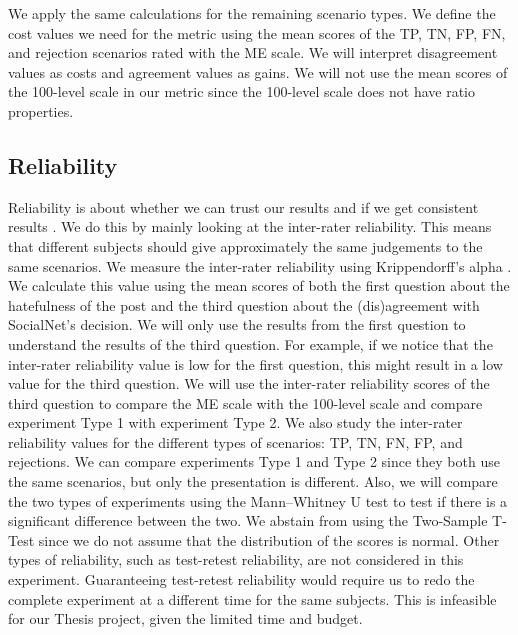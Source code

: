 \documentclass[a4paper]{article}
\begin{document}
We apply the same calculations for the remaining scenario types. We define the cost values we need for the metric using the mean scores of the TP, TN, FP, FN, and rejection scenarios rated with the ME scale. We will interpret disagreement values as costs and agreement values as gains. We will not use the mean scores of the 100-level scale in our metric since the 100-level scale does not have ratio properties.

\subsection{Reliability}
Reliability is about whether we can trust our results and if we get consistent results \cite{fitzner2007reliability}. We do this by mainly looking at the inter-rater reliability. This means that different subjects should give approximately the same judgements to the same scenarios. We measure the inter-rater reliability using Krippendorff's alpha \cite{maddalena2017crowdsourcing, krippendorff2004reliability}. We calculate this value using the mean scores of both the first question about the hatefulness of the post and the third question about the (dis)agreement with SocialNet’s decision. We will only use the results from the first question to understand the results of the third question. For example, if we notice that the inter-rater reliability value is low for the first question, this might result in a low value for the third question. We will use the inter-rater reliability scores of the third question to compare the ME scale with the 100-level scale and compare experiment Type 1 with experiment Type 2. We also study the inter-rater reliability values for the different types of scenarios: TP, TN, FN, FP, and rejections. We can compare experiments Type 1 and Type 2 since they both use the same scenarios, but only the presentation is different. Also, we will compare the two types of experiments using the Mann–Whitney U test to test if there is a significant difference between the two. We abstain from using the Two-Sample T-Test since we do not assume that the distribution of the scores is normal. Other types of reliability, such as test-retest reliability, are not considered in this experiment. Guaranteeing test-retest reliability would require us to redo the complete experiment at a different time for the same subjects. This is infeasible for our Thesis project, given the limited time and budget.
\end{document}
